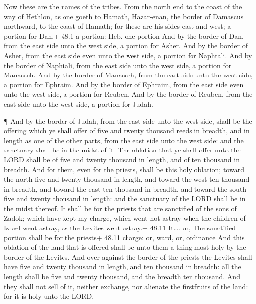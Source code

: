  Now these are the names of the tribes. From the north end
to the coast of the way of Hethlon, as one goeth to Hamath, Hazar-enan,
the border of Damascus northward, to the coast of Hamath; for these are
his sides east and west; a portion for Dan.+ 48.1 a portion: Heb. one
portion  And by the border of Dan, from the east side unto
the west side, a portion for Asher.  And by the border of
Asher, from the east side even unto the west side, a portion for
Naphtali.  And by the border of Naphtali, from the east side
unto the west side, a portion for Manasseh.  And by the
border of Manasseh, from the east side unto the west side, a portion for
Ephraim.  And by the border of Ephraim, from the east side
even unto the west side, a portion for Reuben.  And by the
border of Reuben, from the east side unto the west side, a portion for
Judah.

 ¶ And by the border of Judah, from the east side unto the
west side, shall be the offering which ye shall offer of five and twenty
thousand reeds in breadth, and in length as one of the other parts, from
the east side unto the west side: and the sanctuary shall be in the
midst of it.  The oblation that ye shall offer unto the LORD
shall be of five and twenty thousand in length, and of ten thousand in
breadth.  And for them, even for the priests, shall be this
holy oblation; toward the north five and twenty thousand in length, and
toward the west ten thousand in breadth, and toward the east ten
thousand in breadth, and toward the south five and twenty thousand in
length: and the sanctuary of the LORD shall be in the midst thereof.
 It shall be for the priests that are sanctified of the
sons of Zadok; which have kept my charge, which went not astray when the
children of Israel went astray, as the Levites went astray.+ 48.11
It\ldots: or, The sanctified portion shall be for the priests+ 48.11
charge: or, ward, or, ordinance  And this oblation of the
land that is offered shall be unto them a thing most holy by the border
of the Levites.  And over against the border of the priests
the Levites shall have five and twenty thousand in length, and ten
thousand in breadth: all the length shall be five and twenty thousand,
and the breadth ten thousand.  And they shall not sell of
it, neither exchange, nor alienate the firstfruits of the land: for it
is holy unto the LORD.

